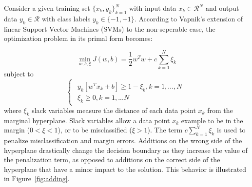 \documentclass[conference,compsoc]{IEEEtran}
\begin{document}
Consider a given training set $\{x_k,y_k\}^N_{k=1}$ with input data $x_k \in \mathcal{R}^N $ and output data $y_k \in \mathcal{R} $ with class labels $y_k \in \{-1,+1 \}$. According to Vapnik's extension of linear Support Vector Machines (SVMs) to the non-seperable case, the optimization problem in its primal form becomes:

\begin{equation}
\min\limits_{w,b,\xi} J(w,b) = \frac{1}{2}w^Tw + c \sum_{k=1}^{N}\xi_k
\end{equation}
subject to
\begin{equation*}
\begin{cases}
\begin{aligned}
  y_k[w^Tx_k+b] \geq 1-\xi_k, k=1,...,N \\
  \xi_k \geq 0, k =1,...N
\end{aligned}
\end{cases}
\end{equation*}
where $\xi_k$ slack variables measure the distance of each data point $x_k$ from the marginal hyperplane. Slack variables allow a data point $x_k$ example to be in the margin ($0< \xi<1$), or to be misclassified ($\xi>1$).
The term $c \sum_{k=1}^{N}\xi_k$ is used to penalize misclassification and margin errors. Additions on the wrong side of the hyperplane drastically change the decision boundary as they increase the value of the penalization term, as opposed to additions on the correct side of the hyperplane that have a minor impact to the solution. This behavior is illustrated in Figure~\ref{fig:adding}. 
\end{document}
